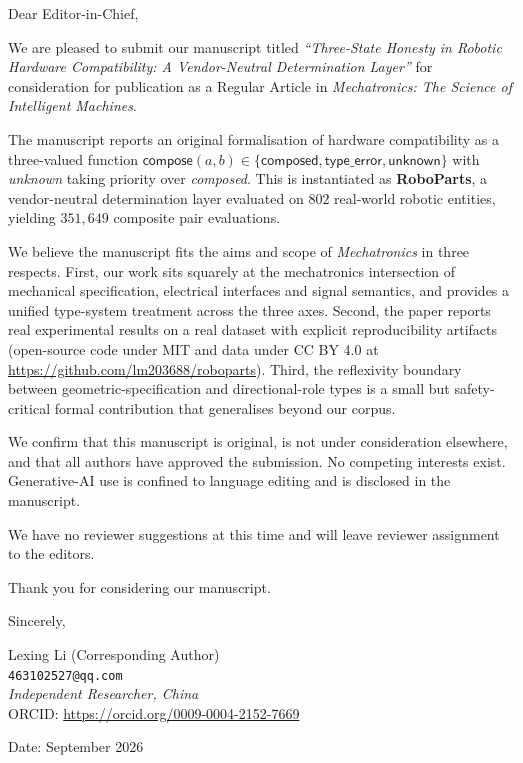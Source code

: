 \documentclass[12pt]{article}
\begin{document}
\vspace*{1cm}

Dear Editor-in-Chief,

We are pleased to submit our manuscript titled \emph{``Three-State
Honesty in Robotic Hardware Compatibility: A Vendor-Neutral
Determination Layer''} for consideration for publication as a Regular
Article in \emph{Mechatronics: The Science of Intelligent Machines}.

The manuscript reports an original formalisation of hardware
compatibility as a three-valued function
$\mathsf{compose}(a,b) \in \{\mathsf{composed}, \mathsf{type\_error},
\mathsf{unknown}\}$ with \emph{unknown} taking priority over
\emph{composed}. This is instantiated as \textbf{RoboParts}, a
vendor-neutral determination layer evaluated on $802$ real-world
robotic entities, yielding $351{,}649$ composite pair evaluations.

We believe the manuscript fits the aims and scope of \emph{Mechatronics}
in three respects. First, our work sits squarely at the mechatronics
intersection of mechanical specification, electrical interfaces and
signal semantics, and provides a unified type-system treatment across
the three axes. Second, the paper reports real experimental results
on a real dataset with explicit reproducibility artifacts
(open-source code under MIT and data under CC BY 4.0 at
\url{https://github.com/lm203688/roboparts}). Third, the reflexivity
boundary between geometric-specification and directional-role types is
a small but safety-critical formal contribution that generalises
beyond our corpus.

We confirm that this manuscript is original, is not under consideration
elsewhere, and that all authors have approved the submission. No
competing interests exist. Generative-AI use is confined to language
editing and is disclosed in the manuscript.

We have no reviewer suggestions at this time and will leave reviewer
assignment to the editors.

Thank you for considering our manuscript.

Sincerely,

\vspace{1.5cm}

Lexing Li (Corresponding Author)\\
\texttt{463102527@qq.com}\\
\textit{Independent Researcher, China}\\
ORCID: \url{https://orcid.org/0009-0004-2152-7669}

\vspace{2cm}

\noindent Date: September 2026
\end{document}
